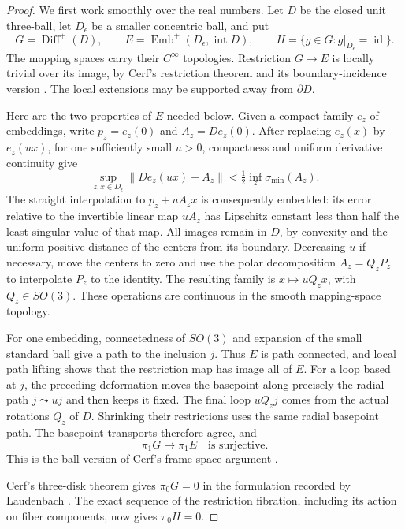 \begin{proof}
We first work smoothly over the real numbers.  Let $D$ be the closed
unit three-ball, let $D_\epsilon$ be a smaller concentric ball, and put
\[
 G=\operatorname{Diff}^{+}(D),\qquad
 E=\operatorname{Emb}^{+}(D_\epsilon,\operatorname{int}D),\qquad
 H=\{g\in G:g|_{D_\epsilon}=\operatorname{id}\}.
\]
The mapping spaces carry their $C^\infty$ topologies.  Restriction
$G\to E$ is locally trivial over its image, by Cerf's restriction
theorem and its boundary-incidence version
\cite[Theorem~1, p.~8-01, and Section~2.3, p.~8-05]{Cerf1962Fibration}.
The local extensions may be supported away from $\partial D$.

Here are the two properties of $E$ needed below.  Given a compact
family $e_z$ of embeddings, write $p_z=e_z(0)$ and $A_z=De_z(0)$.
After replacing $e_z(x)$ by $e_z(ux)$, for one sufficiently small
$u>0$, compactness and uniform derivative continuity give
\[
 \sup_{z,x\in D_\epsilon}\|De_z(ux)-A_z\|
       <\tfrac12\inf_z\sigma_{\min}(A_z).
\]
The straight interpolation to $p_z+uA_zx$ is consequently embedded:
its error relative to the invertible linear map $uA_z$ has Lipschitz
constant less than half the least singular value of that map.
All images remain in $D$, by convexity and the uniform positive
distance of the centers from its boundary.  Decreasing $u$ if
necessary, move the centers to zero and use the polar decomposition
$A_z=Q_zP_z$ to interpolate $P_z$ to the identity.  The resulting
family is $x\mapsto uQ_zx$, with $Q_z\in SO(3)$.  These operations
are continuous in the smooth mapping-space topology.

For one embedding, connectedness of $SO(3)$ and expansion of the
small standard ball give a path to the inclusion $j$.  Thus $E$ is
path connected, and local path lifting shows that the restriction
map has image all of $E$.  For a loop based at $j$, the preceding
deformation moves the basepoint along precisely the radial path
$j\leadsto uj$ and then keeps it fixed.  The final loop $uQ_zj$
comes from the actual rotations $Q_z$ of $D$.  Shrinking their
restrictions uses the same radial basepoint path.  The basepoint
transports therefore agree, and
\[
                        \pi_1G\longrightarrow\pi_1E
                  \quad\text{is surjective}.
\]
This is the ball version of Cerf's frame-space argument
\cite[Proposition~3, p.~8-10]{Cerf1962Fibration}.

Cerf's three-disk theorem gives $\pi_0G=0$ in the formulation
recorded by Laudenbach
\cite[Chapter~I, Theorem~1.2, p.~8]{Laudenbach1974}.
The exact sequence of the restriction fibration, including its
action on fiber components, now gives $\pi_0H=0$.


\end{proof}
